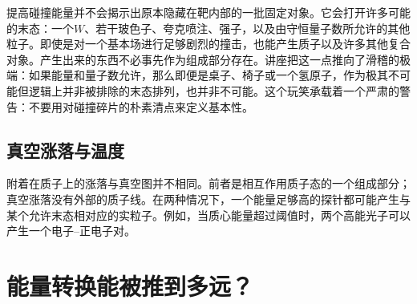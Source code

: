 提高碰撞能量并不会揭示出原本隐藏在靶内部的一批固定对象。它会打开许多可能的末态：一个\(W\)、若干玻色子、夸克喷注、强子，以及由守恒量子数所允许的其他粒子。即使是对一个基本场进行足够剧烈的撞击，也能产生质子以及许多其他复合对象。产生出来的东西不必事先作为组成部分存在。讲座把这一点推向了滑稽的极端：如果能量和量子数允许，那么即便是桌子、椅子或一个氢原子，作为极其不可能但逻辑上并非被排除的末态排列，也并非不可能。这个玩笑承载着一个严肃的警告：不要用对碰撞碎片的朴素清点来定义基本性。

\subsection{真空涨落与温度}

附着在质子上的涨落与真空图并不相同。前者是相互作用质子态的一个组成部分；真空涨落没有外部的质子线。在两种情况下，一个能量足够高的探针都可能产生与某个允许末态相对应的实粒子。例如，当质心能量超过阈值时，两个高能光子可以产生一个电子--正电子对。

\begin{classroomqa}
\end{classroomqa}

\begin{classroomqa}
\end{classroomqa}

\begin{classroomqa}
\end{classroomqa}

\section{能量转换能被推到多远？}

